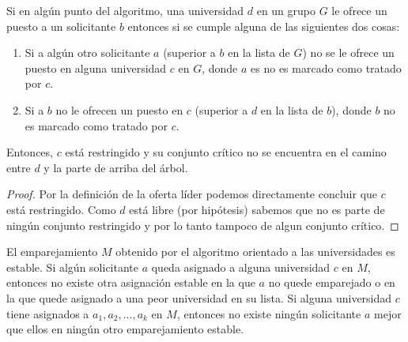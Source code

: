 \begin{lem}
Si en algún punto del algoritmo, una universidad $d$ en un grupo $G$ le ofrece un puesto a un solicitante $b$ entonces si se cumple alguna de las siguientes dos cosas:
\begin{enumerate}
\item Si a algún otro solicitante $a$ (superior a $b$ en la lista de $G$) no se le ofrece un puesto en alguna universidad $c$ en $G$, donde $a$ es no es marcado como tratado por $c$.
\item Si a $b$ no le ofrecen un puesto en $c$ (superior a $d$ en la lista de $b$), donde $b$ no es marcado como tratado por $c$.
\end{enumerate}
Entonces, $c$ está restringido y su conjunto crítico no se encuentra en el camino entre $d$ y la parte de arriba del árbol.
\end{lem}
\begin{proof}
Por la definición de la oferta líder podemos directamente concluir que $c$ está restringido. Como $d$ está libre (por hipótesis) sabemos que no es parte de ningún conjunto restringido y por lo tanto tampoco de algun conjunto crítico.
\end{proof}
\begin{teo}
El emparejamiento $M$ obtenido por el algoritmo orientado a las universidades es estable. Si algún solicitante $a$ queda asignado a alguna universidad $c$ en $M$, entonces no existe otra asignación estable en la que $a$ no quede emparejado o en la que quede asignado a una peor universidad en su lista. Si alguna universidad $c$ tiene asignados a $a_1,a_2,\dots,a_k$ en $M$, entonces no existe ningún solicitante $a$ mejor  que ellos en ningún otro emparejamiento estable.
\end{teo}
